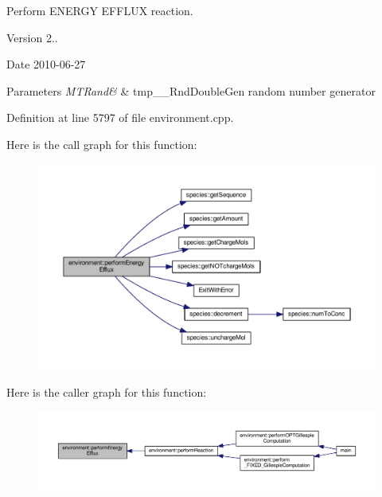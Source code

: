 Perform E\-N\-E\-R\-G\-Y E\-F\-F\-L\-U\-X reaction. 

\begin{DoxyVersion}{Version}
2.. 
\end{DoxyVersion}
\begin{DoxyDate}{Date}
2010-\/06-\/27 
\end{DoxyDate}

\begin{DoxyParams}{Parameters}
{\em M\-T\-Rand\&} & tmp\-\_\-\-\_\-\-Rnd\-Double\-Gen random number generator \\
\hline
\end{DoxyParams}


Definition at line 5797 of file environment.\-cpp.



Here is the call graph for this function\-:\nopagebreak
\begin{figure}[H]
\begin{center}
\leavevmode
\includegraphics[width=350pt]{a00011_aff7607e0f3a74790109a7d87de3031bd_cgraph}
\end{center}
\end{figure}




Here is the caller graph for this function\-:\nopagebreak
\begin{figure}[H]
\begin{center}
\leavevmode
\includegraphics[width=350pt]{a00011_aff7607e0f3a74790109a7d87de3031bd_icgraph}
\end{center}
\end{figure}


